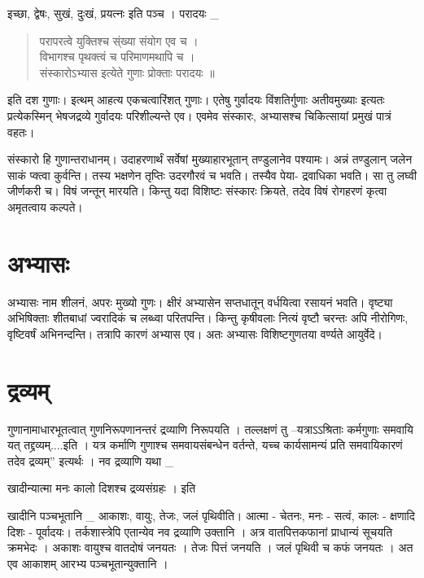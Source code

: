 \begin{vere}
इच्छा, द्वेषः, सुखं, दुःखं, प्रयत्नः इति पञ्च । परादयः \_
\begin{verse}
परापरत्वे युक्तिश्च स्ंख्या संयोग एव च ।\\
विभागश्च पृथक्त्वं च परिमाणमथापि च ।\\
संस्कारोऽभ्यास इत्येते गुणाः प्रोक्ताः परादयः ॥
\end{verse}
इति दश गुणाः। इत्थम् आहत्य एकचत्वारिंशत् गुणाः। एतेषु गुर्वादयः विंशतिर्गुणाः अतीवमुख्याः इत्यतः प्रत्येकस्मिन् भेषजद्रव्ये गुर्वादयः परिशील्यन्ते एव। एवमेव संस्कारः, अभ्यासश्च चिकित्सायां प्रमुखं पात्रं वहतः।

संस्कारो हि गुणान्तराधानम्। उदाहरणार्थं सर्वेषां मुख्याहारभूतान् तण्डुलानेव पश्यामः। अन्नं तण्डुलान् जलेन साकं प्क्त्वा कुर्वन्ति। तस्य भक्षणेन तृप्तिः उदरगौरवं च भवति। तस्यैव पेया-  द्रवाधिका भवति। सा तु लघ्वी जीर्णकरी च। विषं जन्तून् मारयति। किन्तु यदा विशिष्टः संस्कारः क्रियते, तदेव विषं रोगहरणं कृत्वा अमृतत्वाय कल्पते।

\section*{अभ्यासः}

अभ्यासः नाम शीलनं, अपरः मुख्यो गुणः। क्षीरं अभ्यासेन सप्तधातून् वर्धयित्वा रसायनं भवति। वृष्ट्या अभिषिक्ताः शीतबाधां ज्वरादिकं च लब्ध्वा परितपन्ति। किन्तु कृषीवलाः नित्यं वृष्टौ चरन्तः अपि नीरोगिणः, वृष्टिवर्षं अभिनन्दन्ति। तत्रापि कारणं अभ्यास एव। अतः अभ्यासः विशिष्टगुणतया वर्ण्यते आयुर्वेदे।

\section*{द्रव्यम्}

गुणानामाधारभूतत्वात् गुणनिरूपणानन्तरं द्रव्याणि निरूपयति । तल्लक्षणं तु –यत्राऽऽश्रिताः कर्मगुणाः समवायि यत् तद्द्रव्यम्....इति । यत्र कर्माणि गुणाश्च समवायसंबन्धेन वर्तन्ते, यच्च कार्यसामन्यं प्रति समवायिकारणं तदेव द्रव्यम्” इत्यर्थः । नव द्रव्याणि यथा \_

खादीन्यात्मा मनः कालो दिशश्च द्रव्यसंग्रहः । इति

खादीनि पञ्चभूतानि _ आकाशः, वायुः, तेजः, जलं पृथिवीति। आत्मा - चेतनः, मनः - सत्वं, कालः - क्षणादि दिशः - पूर्वादयः। तर्कशास्त्रेपि एतान्येव नव द्रव्याणि उक्तानि । अत्र वातपित्तकफानां प्राधान्यं सूचयति क्रमभेदः । अकाशः वायुश्च वातदोषं जनयतः । तेजः पित्तं जनयति । जलं पृथिवी च कफं जनयतः । अत एव आकाशम् आरभ्य पञ्चभूतान्युक्तानि ।


\end{vere}
